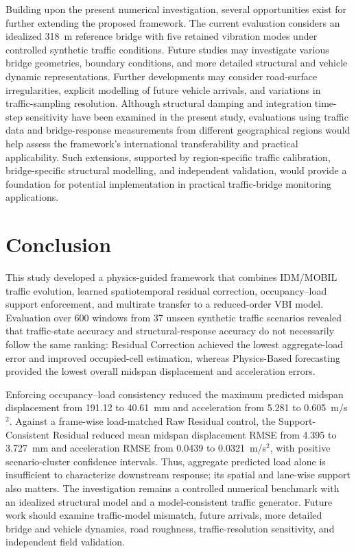 \documentclass[journal]{IEEEtran}
\begin{document}
Building upon the present numerical investigation, several opportunities exist for further extending the proposed framework. The current evaluation considers an idealized 318~m reference bridge with five retained vibration modes under controlled synthetic traffic conditions. Future studies may investigate various bridge geometries, boundary conditions, and more detailed structural and vehicle dynamic representations. Further developments may consider road-surface irregularities, explicit modelling of future vehicle arrivals, and variations in traffic-sampling resolution. Although structural damping and integration time-step sensitivity have been examined in the present study, evaluations using traffic data and bridge-response measurements from different geographical regions would help assess the framework's international transferability and practical applicability. Such extensions, supported by region-specific traffic calibration, bridge-specific structural modelling, and independent validation, would provide a foundation for potential implementation in practical traffic-bridge monitoring applications.


\section{Conclusion}

This study developed a physics-guided framework that combines IDM/MOBIL traffic evolution, learned spatiotemporal residual correction, occupancy--load support enforcement, and multirate transfer to a reduced-order VBI model. Evaluation over 600 windows from 37 unseen synthetic traffic scenarios revealed that traffic-state accuracy and structural-response accuracy do not necessarily follow the same ranking: Residual Correction achieved the lowest aggregate-load error and improved occupied-cell estimation, whereas Physics-Based forecasting provided the lowest overall midspan displacement and acceleration errors.

Enforcing occupancy--load consistency reduced the maximum predicted midspan displacement from 191.12 to 40.61~mm and acceleration from 5.281 to 0.605~m/s$^2$. Against a frame-wise load-matched Raw Residual control, the Support-Consistent Residual reduced mean midspan displacement RMSE from 4.395 to 3.727~mm and acceleration RMSE from 0.0439 to 0.0321~m/s$^2$, with positive scenario-cluster confidence intervals. Thus, aggregate predicted load alone is insufficient to characterize downstream response; its spatial and lane-wise support also matters. The investigation remains a controlled numerical benchmark with an idealized structural model and a model-consistent traffic generator. Future work should examine traffic-model mismatch, future arrivals, more detailed bridge and vehicle dynamics, road roughness, traffic-resolution sensitivity, and independent field validation.
\end{document}
